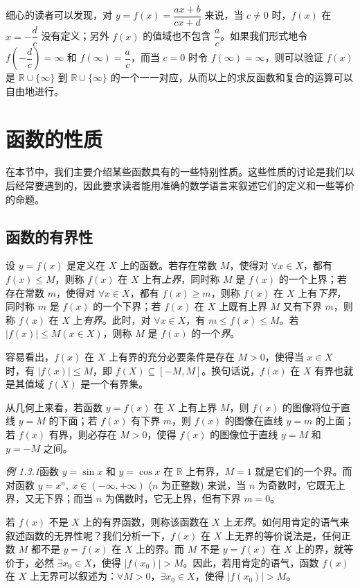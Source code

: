 \documentclass[UTF8,12pt,a4paper,fontset=fandol]{ctexbook}
\begin{document}
细心的读者可以发现，对 $y=f(x)=\dfrac{ax+b}{cx+d}$ 来说，当 $c\ne0$ 时，$f(x)$ 在 $x=-\dfrac dc$ 没有定义；另外 $f(x)$ 的值域也不包含 $\dfrac ac$。如果我们形式地令 $f(-\dfrac dc)=\infty$ 和 $f(\infty)=\dfrac ac$，而当 $c=0$ 时令 $f(\infty)=\infty$，则可以验证 $f(x)$ 是 $\mathbb{R}\cup\{\infty\}$ 到 $\mathbb{R}\cup\{\infty\}$ 的一个一一对应，从而以上的求反函数和复合的运算可以自由地进行。

\section{函数的性质}

在本节中，我们主要介绍某些函数具有的一些特别性质。这些性质的讨论是我们以后经常要遇到的，因此要求读者能用准确的数学语言来叙述它们的定义和一些等价的命题。

\subsection{函数的有界性}

设 $y=f(x)$ 是定义在 $X$ 上的函数。若存在常数 $M$，使得对 $\forall x\in X$，都有 $f(x)\leqslant M$，则称 $f(x)$ 在 $X$ 上有\emph{上界}，同时称 $M$ 是 $f(x)$ 的一个上界；若存在常数 $m$，使得对 $\forall x\in X$，都有 $f(x)\geqslant m$，则称 $f(x)$ 在 $X$ 上有\emph{下界}，同时称 $m$ 是 $f(x)$ 的一个下界；若 $f(x)$ 在 $X$ 上既有上界 $M$ 又有下界 $m$，则称 $f(x)$ 在 $X$ 上\emph{有界}。此时，对 $\forall x\in X$，有 $m\leqslant f(x)\leqslant M$。若 $|f(x)|\leqslant M(x\in X)$，则称 $M$ 是 $f(x)$ 的一个\emph{界}。

容易看出，$f(x)$ 在 $X$ 上有界的充分必要条件是存在 $M>0$，使得当 $x\in X$ 时，有 $|f(x)|\leqslant M$，即 $f(X)\subseteq[-M,M]$。换句话说，$f(x)$ 在 $X$ 有界也就是其值域 $f(X)$ 是一个有界集。

从几何上来看，若函数 $y=f(x)$ 在 $X$ 上有上界 $M$，则 $f(x)$ 的图像将位于直线 $y=M$ 的下面；若 $f(x)$ 有下界 $m$，则 $f(x)$ 的图像在直线 $y=m$ 的上面；若 $f(x)$ 有界，则必存在 $M>0$，使得 $f(x)$ 的图像位于直线 $y=M$ 和 $y=-M$ 之间。

\noindent\emph{例 1.3.1}\quad 函数 $y=\sin x$ 和 $y=\cos x$ 在 $\mathbb{R}$ 上有界，$M=1$ 就是它们的一个界。而对函数 $y=x^n,\ x\in(-\infty,+\infty)$ ($n$ 为正整数) 来说，当 $n$ 为奇数时，它既无上界，又无下界；而当 $n$ 为偶数时，它无上界，但有下界 $m=0$。

若 $f(x)$ 不是 $X$ 上的有界函数，则称该函数在 $X$ 上\emph{无界}。如何用肯定的语气来叙述函数的无界性呢？我们分析一下，$f(x)$ 在 $X$ 上无界的等价说法是，任何正数 $M$ 都不是 $y=f(x)$ 在 $X$ 上的界。而 $M$ 不是 $y=f(x)$ 在 $X$ 上的界，就等价于，必然 $\exists x_0\in X$，使得 $|f(x_0)|>M$。因此，若用肯定的语气，函数 $f(x)$ 在 $X$ 上无界可以叙述为：$\forall M>0$，$\exists x_0\in X$，使得 $|f(x_0)|>M$。
\end{document}
